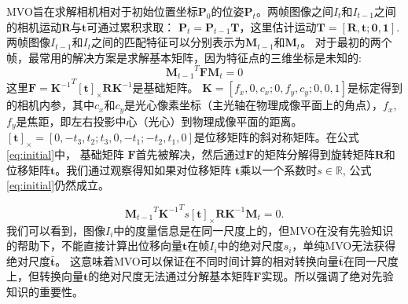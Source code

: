 MVO旨在求解相机相对于初始位置坐标$\mathbf{P}_0$的位姿$\mathbf{P}_t$。两帧图像之间$I_t$和$I_{t-1}$之间的相机运动$\mathbf{R}$与$\mathbf{t}$可通过累积求取：
$\mathbf{P}_t = \mathbf{P}_{t-1}\mathbf{T}$，这里估计运动$\mathbf{T}=[\mathbf{R},\mathbf{t};\mathbf{0},\mathbf{1}]$. 
两帧图像$I_{t-1}$和$I_t$之间的匹配特征可以分别表示为$\mathbf{M}_{t-1}$和$\mathbf{M}_t$。
对于最初的两个帧，最常用的解决方案是求解基本矩阵，因为特征点的三维坐标是未知的\cite{luong1996fundamental}:
\begin{equation}
    {\mathbf{M}_{t-1}}^T\mathbf{F}\mathbf{M}_{t}=0
\label{eq:initial}   
\end{equation}
这里$\mathbf{F}={\mathbf{K}^{-1}}^{T}{[\mathbf{t}]_\times}\mathbf{R}\mathbf{K}^{-1}$是基础矩阵。
$\mathbf{K}=[f_x,0,c_x;0,f_y,c_y;0,0,1]$是标定得到的相机内参，其中$c_x$和$c_y$是光心像素坐标（主光轴在物理成像平面上的角点），$f_x$, $f_y$是焦距，即左右投影中心（光心）到物理成像平面的距离。$\mathbf{[\mathbf{t}]_\times} = [0, -t_3, t_2; t_3, 0, -t_1; -t_2, t_1, 0]$是位移矩阵的斜对称矩阵。在公式\eqref{eq:initial}中， 基础矩阵
$\mathbf{F}$首先被解决，然后通过$\mathbf{F}$的矩阵分解得到旋转矩阵$\mathbf{R}$和位移矩阵$\mathbf{t}$\cite{Nister2004An}。我们通过观察得知如果对位移矩阵
$\mathbf{t}$乘以一个系数时$s \in \mathbb{R}$, 公式\eqref{eq:initial}仍然成立。

\begin{equation}
    {\mathbf{M}_{t-1}}^T{\mathbf{K}^{-1}}^{T}{s}{[\mathbf{t}]_\times}\mathbf{R}\mathbf{K}^{-1}\mathbf{M}_{t}=0.
\end{equation}
我们可以看到，图像$I_i$中的度量信息是在同一尺度上的，但MVO在没有先验知识的帮助下，不能直接计算出位移向量$\mathbf{t}$在帧$I_i$中的绝对尺度$s_i$，单纯MVO无法获得绝对尺度$\mathbf{\bar{t}}$。
这意味着MVO可以保证在不同时间计算的相对转换向量$\bar{\mathbf{t}}$在同一尺度上，但转换向量$\mathbf{t}$的绝对尺度无法通过分解基本矩阵$\mathbf{F}$实现。所以强调了绝对先验知识的重要性。

